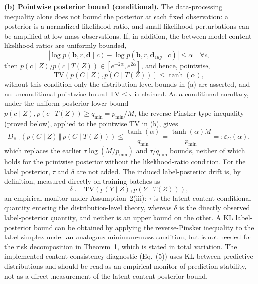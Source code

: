 \documentclass[electronics,article,submit,moreauthors]{Definitions/mdpi}
\begin{document}
\begin{itemize}[leftmargin=2.7em,labelwidth=2.3em,labelsep=0.4em,align=left]
\textbf{(b) Pointwise posterior bound (conditional).} The data-processing inequality alone does not bound the posterior at each fixed observation: a posterior is a normalized likelihood ratio, and small likelihood perturbations can be amplified at low-mass observations. If, in addition, the between-model content likelihood ratios are uniformly bounded,
\begin{equation}
\left|\log p(\mathbf b,r,\mathbf d\mid c)-\log p(\mathbf b,r,\mathbf d_{aug}\mid c)\right|\le\alpha\quad\forall c,
\end{equation}
then $p(c\mid Z)/p(c\mid T(Z))\in[e^{-2\alpha},e^{2\alpha}]$, and hence, pointwise,
\begin{equation}
\mathrm{TV}\!\left(p(C\mid Z),p(C\mid T(Z))\right)\le\tanh(\alpha),
\label{eq:pointtv}
\end{equation}
without this condition only the distribution-level bounds in (a) are asserted, and no unconditional pointwise bound $\mathrm{TV}\le\tau$ is claimed. As a conditional corollary, under the uniform posterior lower bound $p(c\mid Z),p(c\mid T(Z))\ge q_{\min}=p_{\min}/M$, the reverse-Pinsker-type inequality (proved below), applied to the pointwise TV in (b), gives
\begin{equation}
D_{\mathrm{KL}}\!\left(p(C\mid Z)\,\Vert\,p(C\mid T(Z))\right)\le\frac{\tanh(\alpha)}{q_{\min}}=\frac{\tanh(\alpha)M}{p_{\min}}=:\varepsilon_C(\alpha),
\label{eq:klcorollary}
\end{equation}
which replaces the earlier $\tau\log(M/p_{\min})$ and $\tau/q_{\min}$ bounds, neither of which holds for the pointwise posterior without the likelihood-ratio condition. For the label posterior, $\tau$ and $\delta$ are not added. The induced label-posterior drift is, by definition, measured directly on training batches as
\begin{equation}
\delta:=\mathrm{TV}\!\left(p(Y\mid Z),p(Y\mid T(Z))\right),
\label{eq:labeltv}
\end{equation}
an empirical monitor under Assumption~2(iii): $\tau$ is the latent content-conditional quantity entering the distribution-level theory, whereas $\delta$ is the directly observed label-posterior quantity, and neither is an upper bound on the other. A KL label-posterior bound can be obtained by applying the reverse-Pinsker inequality to the label simplex under an analogous minimum-mass condition, but is not needed for the risk decomposition in Theorem~1, which is stated in total variation. The implemented content-consistency diagnostic (Eq.~(5)) uses KL between predictive distributions and should be read as an empirical monitor of prediction stability, not as a direct measurement of the latent content-posterior bound.
\end{itemize}
\end{document}
